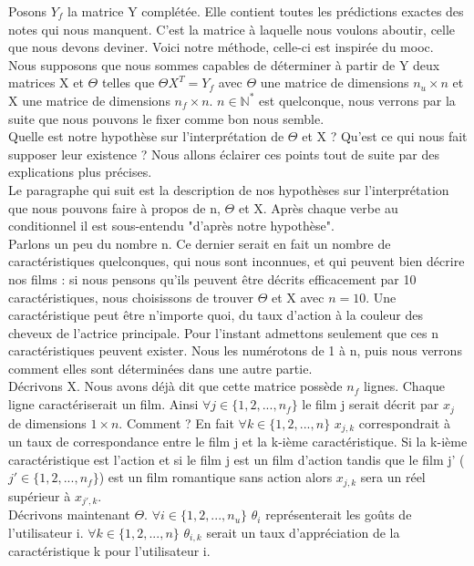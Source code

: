 \documentclass[a4paper,10pt]{article}
\begin{document}
Posons $Y_f$ la matrice Y complétée. Elle contient toutes les prédictions exactes des notes qui nous manquent. C'est la matrice à laquelle nous voulons aboutir, celle que nous devons deviner. Voici notre méthode, celle-ci est inspirée du mooc\cite{mooc}.\\

Nous supposons que nous sommes capables de déterminer à partir de Y deux matrices X et $\Theta$ telles que $\Theta X^T = Y_f$ avec $\Theta$ une matrice de dimensions $n_u \times n$ et X une matrice de dimensions $n_f \times n$. $n \in \mathbb{N}^*$ est quelconque, nous verrons par la suite que nous pouvons le fixer comme bon nous semble.\\ 
Quelle est notre hypothèse sur l'interprétation de $\Theta$ et X ? Qu'est ce qui nous fait supposer leur existence ? Nous allons éclairer ces points tout de suite par des explications plus précises.\\

Le paragraphe qui suit est la description de nos hypothèses sur l'interprétation que nous pouvons faire à propos de n, $\Theta$ et X. Après chaque verbe au conditionnel il est sous-entendu "d'après notre hypothèse".\\
Parlons un peu du nombre n. Ce dernier serait en fait un nombre de caractéristiques quelconques, qui nous sont inconnues, et qui peuvent bien décrire nos films : si nous pensons qu'ils peuvent être décrits efficacement par 10 caractéristiques, nous choisissons de trouver $\Theta$ et X avec $n = 10$. 
Une caractéristique peut être n'importe quoi, du taux d'action à la couleur des cheveux de l'actrice principale. Pour l'instant admettons seulement que ces n caractéristiques peuvent exister. Nous les numérotons de 1 à n, puis nous verrons comment elles sont déterminées dans une autre partie.\\
Décrivons X. Nous avons déjà dit que cette matrice possède $n_f$ lignes. Chaque ligne caractériserait un film. Ainsi $\forall j \in \{1, 2, ..., n_f\}$ le film j serait décrit par $x_j$ de dimensions $1 \times n$. Comment ? En fait $\forall k \in \{1, 2, ..., n\}$ $x_{j,k}$ correspondrait à un taux de correspondance entre le film j et la k-ième caractéristique. Si la k-ième caractéristique est l'action et si le film j est un film d'action tandis que le film j' ($j' \in \{1, 2, ..., n_f\}$) est un film romantique sans action alors $x_{j,k}$ sera un réel supérieur à $x_{j',k}$.\\
Décrivons maintenant $\Theta$. $\forall i \in \{1, 2, ..., n_u\}$ $\theta_{i}$ représenterait les goûts de l'utilisateur i. $\forall k \in \{1, 2, ..., n\}$ $\theta_{i,k}$ serait un taux d'appréciation de la caractéristique k pour l'utilisateur i.\\
\end{document}
